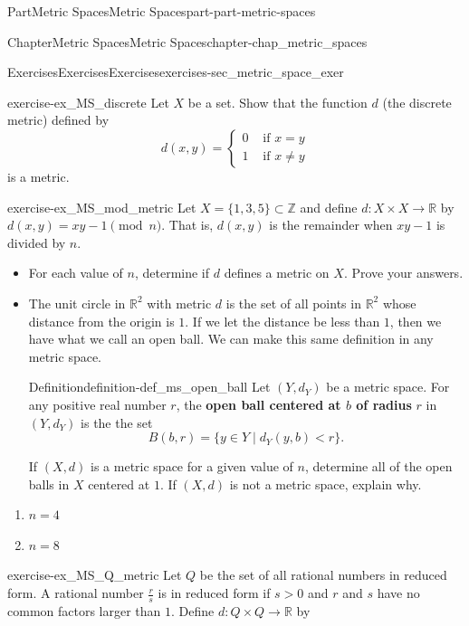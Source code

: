 \documentclass[oneside,10pt,]{book}
\newcommand{\terminology}[1]{\textbf{#1}}
\numberwithin{equation}{chapter}
\newcommand{\Z}{\mathbb{Z}}
\newcommand{\R}{\mathbb{R}}
\newcommand{\lt}{<}
\newcommand{\gt}{>}
\newcommand{\amp}{&}
\begin{document}
\begin{partptx}{Part}{Metric Spaces}{}{Metric Spaces}{}{}{part-part-metric-spaces}
\begin{chapterptx}{Chapter}{Metric Spaces}{}{Metric Spaces}{}{}{chapter-chap_metric_spaces}
\begin{exercises-section}{Exercises}{Exercises}{}{Exercises}{}{}{exercises-sec_metric_space_exer}
\begin{divisionexercise}{1}{}{}{exercise-ex_MS_discrete}%
Let \(X\) be a set. Show that the function \(d\) (the discrete metric) defined by%
\begin{equation*}
d(x,y) = \begin{cases}0 \amp  \text{ if }  x=y \\ 1 \amp  \text{ if }  x \neq y \end{cases}
\end{equation*}
is a metric.%
\end{divisionexercise}%
\begin{divisionexercise}{2}{}{}{exercise-ex_MS_mod_metric}%
Let \(X = \{1,3,5\} \subset \Z\) and define \(d: X \times X \to \R\) by \(d(x,y) = xy - 1 \pmod{n}\). That is, \(d(x,y)\) is the remainder when \(xy - 1\) is divided by \(n\).%
\begin{itemize}[label=\textbullet]
\item{}For each value of \(n\), determine if \(d\) defines a metric on \(X\). Prove your answers.%
\item{}The unit circle in \(\R^2\) with metric \(d\) is the set of all points in \(\R^2\) whose distance from the origin is \(1\). If we let the distance be less than \(1\), then we have what we call an open ball. We can make this same definition in any metric space. \begin{definition}{Definition}{}{definition-def_ms_open_ball}%
Let \((Y, d_Y)\) be a metric space. For any positive real number \(r\), the \terminology{open ball centered at \(b\) of radius} \(r\) in \((Y, d_Y)\) is the the set%
\begin{equation*}
B(b,r) = \{y \in Y \mid d_Y(y,b) \lt  r\}\text{.}
\end{equation*}
%
\end{definition}
 If \((X,d)\) is a metric space for a given value of \(n\), determine all of the open balls in \(X\) centered at \(1\). If \((X,d)\) is not a metric space, explain why.%
\end{itemize}
%
\begin{enumerate}[font=\bfseries,label=(\alph*),ref=\alph*]%
\item{}\(n = 4\)%
\item{}\(n = 8\)%
\end{enumerate}%
\end{divisionexercise}%
\begin{divisionexercise}{3}{}{}{exercise-ex_MS_Q_metric}%
Let \(Q\) be the set of all rational numbers in reduced form. A rational number \(\frac{r}{s}\) is in reduced form if \(s \gt 0\) and \(r\) and \(s\) have no common factors larger than \(1\). Define \(d : Q \times Q \to \R\) by%

\end{divisionexercise}
\end{exercises-section}
\end{chapterptx}
\end{partptx}
\end{document}
